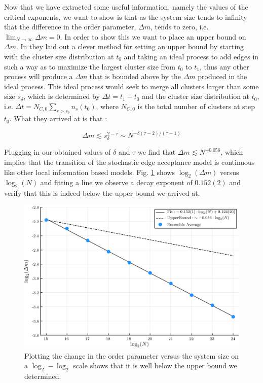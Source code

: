 Now that we have extracted some useful information, namely the values of the critical exponents, we want to show is that as the system size tends to infinity that the difference in the order parameter, $\Delta m$, tends to zero, i.e. $\lim_{N \rightarrow \infty} \Delta m = 0$.
In order to show this we want to place an upper bound on $\Delta m$. In \cite{Lee_1} they laid out a clever method for setting an upper bound by starting with the cluster size distribution at $t_0$ and taking an ideal process to add edges in such a way as to maximize the largest cluster size from $t_0$ to $t_1$, thus any other process will produce a $\Delta m$ that is bounded above by the $\Delta m$ produced in the ideal process.
This ideal process would seek to merge all clusters larger than some size $s_\delta$, which is determined by $\Delta t = t_1 - t_0$ and the cluster size distribution at $t_0$, i.e. $\Delta t = N_{C, 0} \sum_{s > s_\delta} n_s(t_0)$, where $N_{C, 0}$ is the total number of clusters at step $t_0$.
What they arrived at is that \cite{Lee_1}:

\begin{equation}
	\Delta m \lesssim s_\delta^{2 - \tau} \sim N^{-\delta (\tau - 2) / (\tau - 1)}
\end{equation}

Plugging in our obtained values of $\delta$ and $\tau$ we find that $\Delta m \lesssim N^{-0.056}$, which implies that the transition of the stochastic edge acceptance model is continuous like other local information based models.
Fig. \ref{fig:delta_m_scaling} shows $\log_2(\Delta m)$ versus $\log_2(N)$ and fitting a line we observe a decay exponent of $0.152(2)$ and verify that this is indeed below the upper bound we arrived at.

\begin{figure}[H]
	\centering
	\includegraphics[width=350pt, clip]{images/delta_m_scaling.png}
	\caption{Plotting the change in the order parameter versus the system size on a $\log_2-\log_2$ scale shows that it is well below the upper bound we determined.}
	\label{fig:delta_m_scaling}
\end{figure}




